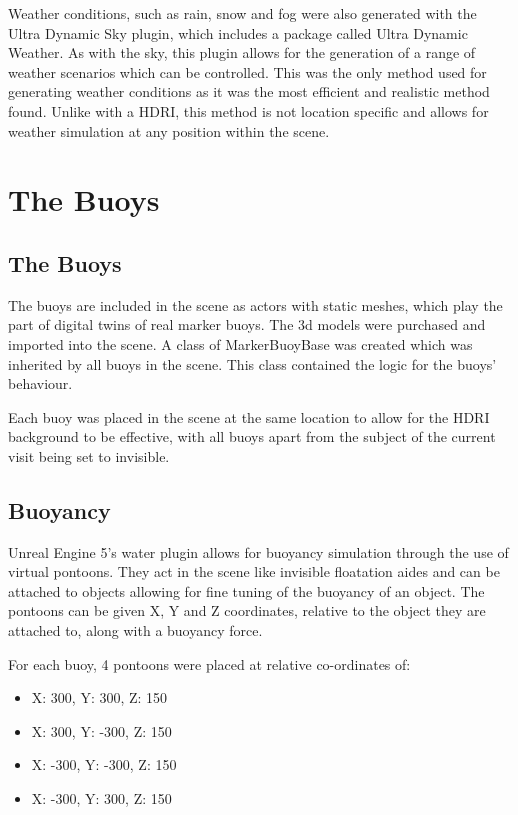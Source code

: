 \documentclass[10pt,twocolumn,letterpaper]{article}
\begin{document}
Weather conditions, such as rain, snow and fog were also generated with the Ultra Dynamic Sky plugin, which includes a package called Ultra Dynamic Weather. As with the sky, this plugin allows for the generation of a range of weather scenarios which can be controlled. This was the only method used for generating weather conditions as it was the most efficient and realistic method found. Unlike with a HDRI, this method is not location specific and allows for weather simulation at any position within the scene.

\section{The Buoys}

\subsection{The Buoys} \label{sec:the_buoys}

The buoys are included in the scene as actors with static meshes, which play the part of digital twins of real marker buoys. The 3d models were purchased and imported into the scene. A class of MarkerBuoyBase was created which was inherited by all buoys in the scene. This class contained the logic for the buoys' behaviour.

Each buoy was placed in the scene at the same location to allow for the HDRI background to be effective, with all buoys apart from the subject of the current visit being set to invisible.

\subsection{Buoyancy}

Unreal Engine 5's water plugin allows for buoyancy simulation through the use of virtual pontoons. They act in the scene like invisible floatation aides and can be attached to objects allowing for fine tuning of the buoyancy of an object. The pontoons can be given X, Y and Z coordinates, relative to the object they are attached to, along with a buoyancy force.

For each buoy, 4 pontoons were placed at relative co-ordinates of:

\begin{itemize}

    \item X: 300, Y: 300, Z: 150
    \item X: 300, Y: -300, Z: 150
    \item X: -300, Y: -300, Z: 150
    \item X: -300, Y: 300, Z: 150 

\end{itemize}
\end{document}
